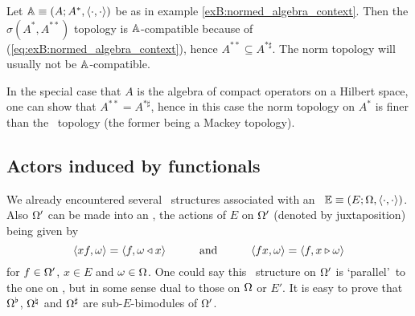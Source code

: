 
\begin{exB} \label{exB:weak_is_compatible}   \rm
  Let $\Aa\equiv (A; A^*, \pairing)$ be as in example \ref{exB:normed_algebra_context}\@.
  Then the $\sigma(A^*, A^{**})$ topology is $\Aa$-compatible because of
  (\ref{eq:exB:normed_algebra_context}), hence $A^{**} \subseteq A^{*\sharp}$.
  The norm topology will usually not be $\Aa$-compatible.

{\small
  In the special case that $A$ is the algebra of compact operators on a Hilbert space,
  one can show that $A^{**} = A^{*\sharp}$, hence in this case the norm topology
  on $A^*$ is finer than the \stricta\ topology (the former being a Mackey topology).
}
\end{exB}




\subsection{Actors induced by functionals}
\label{subsec:Acts_ind_by_funcs}

We already encountered several \Ebimod\ structures associated with an
\context\ $\EE \equiv \EOP$. Also $\Om'$ can be made into an \Ebimod,
the actions of $E$ on $\Om'$ (denoted by juxtaposition) being given by
\begin{equation} \label{eq:Om'isEbimod}
   \pair{xf}{\om} = \pair{f}{\om \ract x} \andspace{3em}
   \pair{fx}{\om} = \pair{f}{x\lact\om}
\end{equation}
for $f\in \Om'$, $x\in E$ and $\om \in \Om$.
One could say this \Ebimod\ structure on $\Om'$ is \lq parallel\rq\ to the
one on \ActE, but in some sense dual to those on $\Om$ or $E'$.
It is easy to prove that $\Om\wdl$, $\Om\mdl$ and $\Om\adl$ are sub-$E$-bimodules of $\Om'$.


